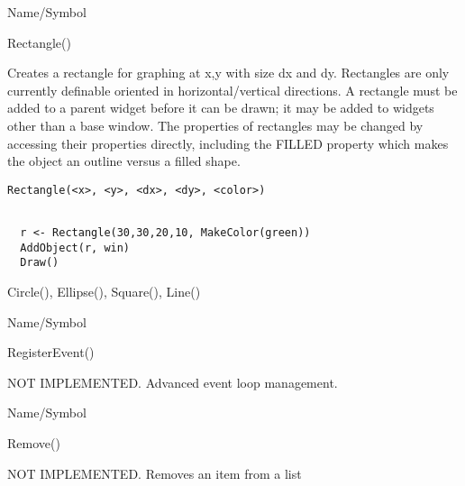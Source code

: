 \rl



\begin{desc}{Name/Symbol}
\item[Name/Symbol]	Rectangle()
  
\item[Description]	Creates a rectangle for graphing at x,y with size
  dx and dy. Rectangles are only currently definable oriented in
  horizontal/vertical directions.  A rectangle  must be added
  to a parent widget before it can be drawn; it may be added to
  widgets other than a base window.  The properties of rectangles may be
  changed by accessing their properties directly, including the FILLED
  property which makes the object an outline versus a filled shape.

\item[Usage]
\begin{verbatim}
Rectangle(<x>, <y>, <dx>, <dy>, <color>)
\end{verbatim}

\item[Example]	
\begin{verbatim}
  
  r <- Rectangle(30,30,20,10, MakeColor(green))
  AddObject(r, win)
  Draw()

\end{verbatim}
\item[See Also]	 Circle(), Ellipse(), Square(), Line()
\end{desc}

\rl




\begin{desc}{Name/Symbol}
\item[Name/Symbol]  	RegisterEvent()

\item[Description]	NOT IMPLEMENTED.  Advanced event loop management.

\item[Usage]		

\item[Example]	

\item[See Also]	
\end{desc}

\rl






\begin{desc}{Name/Symbol}
\item[Name/Symbol]  	Remove()

\item[Description]  	NOT IMPLEMENTED.  Removes an item from a list

\item[Usage]		

\item[Example]	

\item[See Also]	
\end{desc}

